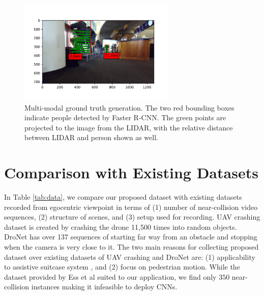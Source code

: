 \begin{figure}
    \centering
        \includegraphics[height=5.0cm,width=0.7\columnwidth]{figs/visDet3D.pdf}
    \caption{Multi-modal ground truth generation. The two red bounding boxes indicate people detected by Faster R-CNN. The green points are projected to the image from the LIDAR, with the relative distance between LIDAR and person shown as well.}\label{fig:gt}
\end{figure}

\section{Comparison with Existing Datasets}
In Table \ref{tab:data}, we compare our proposed dataset with existing datasets recorded from egocentric viewpoint in terms of (1) number of near-collision video sequences, (2) structure of scenes, and (3) setup used for recording. UAV crashing \cite{gandhi} dataset is created by crashing the drone 11,500 times into random objects. DroNet \cite{DroNet} has over 137 sequences of starting far way from an obstacle and stopping when the camera is very close to it. The two main reasons for collecting proposed dataset over existing datasets of UAV crashing and DroNet are: (1) applicability to assistive suitcase system \cite{BBeep}, and (2) focus on pedestrian motion. While the dataset provided by Ess et al \cite{Andreas} suited to our application, we find only $350$ near-collision instances making it infeasible to deploy CNNs.     


